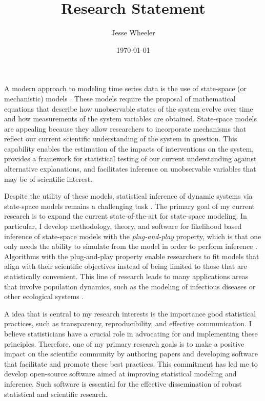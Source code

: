 \documentclass{article}
\title{Research Statement}
\author{Jesse Wheeler}
\date{\today}
\begin{document}
\rule{0mm}{1mm}
\vspace{-20mm}


\vspace{1mm}

\rule{0mm}{1mm}

\vspace{3mm}
\rule{0mm}{1mm}

\vspace{4mm}

\noindent A modern approach to modeling time series data is the use of state-space (or mechanistic) models \cite{durbin12}.
These models require the proposal of mathematical equations that describe how unobservable states of the system evolve over time and how measurements of the system variables are obtained.
State-space models are appealing because they allow researchers to incorporate mechanisms that reflect our current scientific understanding of the system in question.
This capability enables the estimation of the impacts of interventions on the system, provides a framework for statistical testing of our current understanding against alternative explanations, and facilitates inference on unobservable variables that may be of scientific interest.

Despite the utility of these models, statistical inference of dynamic systems via state-space models remains a challenging task \cite{auger16}.
The primary goal of my current research is to expand the current state-of-the-art for state-space modeling.
In particular, I develop methodology, theory, and software for likelihood based inference of state-space models with the {\it plug-and-play} property, which is that one only needs the ability to simulate from the model in order to perform inference \cite{breto09}.
Algorithms with the plug-and-play property enable researchers to fit models that align with their scientific objectives instead of being limited to those that are statistically convenient.
This line of research leads to many applications areas that involve population dynamics, such as the modeling of infectious diseases \cite{wheeler24} or other ecological systems \cite{yang24}.

A idea that is central to my research interests is the importance good statistical practices, such as transparency, reproducibility, and effective communication.
I believe statisticians have a crucial role in advocating for and implementing these principles. Therefore, one of my primary research goals is to make a positive impact on the scientific community by authoring papers and developing software that facilitate and promote these best practices.
This commitment has led me to develop open-source software aimed at improving statistical modeling and inference.
Such software is essential for the effective dissemination of robust statistical and scientific research.
\end{document}

